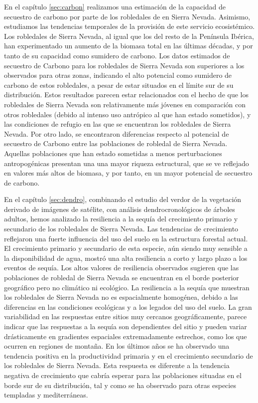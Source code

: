 En el capítulo \ref{sec:carbon} realizamos una estimación de la capacidad de secuestro de carbono por parte de los robledales de \Qp en Sierra Nevada. Asimismo, estudiamos las tendencias temporales de la provisión de este servicio ecosistémico. Los robledales de Sierra Nevada, al igual que los del resto de la Península Ibérica, han experimentado un aumento de la biomasa total en las últimas décadas, y por tanto de su capacidad como sumidero de carbono. Los datos estimados de secuestro de Carbono para los robledales de Sierra Nevada son superiores a los observados para otras zonas, indicando el alto potencial como sumidero de carbono de estos robledales, a pesar de estar situados en el límite sur de su distribución. Estos resultados parecen estar relacionados con el hecho de que los robledales de Sierra Nevada son relativamente más jóvenes en comparación con otros robledales (debido al intenso uso antrópico al que han estado sometidos), y las condiciones de refugio en las que se encuentran los robledales de Sierra Nevada. Por otro lado, se encontraron diferencias  respecto al potencial de secuestro de Carbono entre las poblaciones de robledal de Sierra Nevada. Aquellas poblaciones que han estado sometidas a menos perturbaciones antropogénicas presentan una una mayor riqueza estructural, que se ve reflejado en valores más altos de biomasa, y por tanto, en un mayor potencial de secuestro de carbono. 

En el capítulo \ref{sec:dendro}, combinando el estudio del verdor de la vegetación derivado de imágenes de satélite, con análisis dendrocronológicos de árboles adultos, hemos analizado la resiliencia a la sequía del crecimiento primario y secundario de los robledales de Sierra Nevada. Las tendencias de crecimiento reflejaron una fuerte influencia del uso del suelo en la estructura forestal actual. El crecimiento primario y secundario de esta especie, aún siendo muy sensible a la disponibilidad de agua, mostró una alta resiliencia a corto y largo plazo a los eventos de sequía. Los altos valores de resiliencia observados sugieren que las poblaciones de robledal de Sierra Nevada se encuentran en el borde posterior geográfico pero no climático ni ecológico. La resiliencia a la sequía que muestran los robledales de Sierra Nevada no es espacialmente homogénea, debido a las diferencias en las condiciones ecológicas y a los legados del uso del suelo. La gran variabilidad en las respuestas entre sitios muy cercanos geográficamente, parece indicar que las respuestas a la sequía son dependientes del sitio y pueden variar drásticamente en gradientes espaciales extremadamente estrechos, como los que ocurren en regiones de montaña. En los últimos años se ha observado una tendencia positiva en la productividad primaria y en el crecimiento secundario de los robledales de Sierra Nevada. Esta respuesta es diferente a la tendencia negativa de crecimiento que cabría esperar para las poblaciones situadas en el borde sur de su distribución, tal y como se ha observado para otras especies templadas y mediterráneas. 

